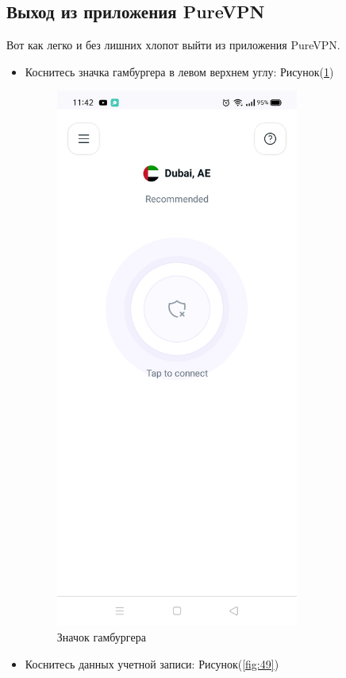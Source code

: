 \subsection{Выход из приложения PureVPN} 
Вот как легко и без лишних хлопот выйти из приложения PureVPN.
\begin{itemize}
\item Коснитесь значка гамбургера в левом верхнем углу:  Рисунок(\ref{fig:48})
\begin{figure}[H]
\includegraphics[width=8cm]{35.png}
\centering
\caption{Значок гамбургера}
\label{fig:48}
\end{figure}
\item Коснитесь данных учетной записи:  Рисунок(\ref{fig:49})
\begin{figure}[H]

\end{figure}
\end{itemize}
